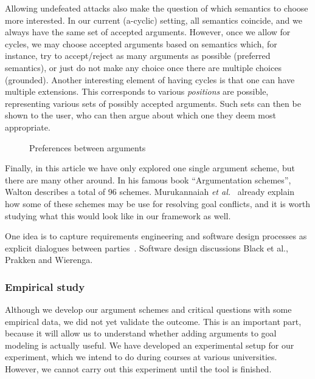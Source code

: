 Allowing undefeated attacks also make the question of which semantics to choose more interested. In our current (a-cyclic) setting, all semantics coincide, and we always have the same set of accepted arguments. However, once we allow for cycles, we may choose accepted arguments based on semantics which, for instance, try to accept/reject as many arguments as possible (preferred semantics), or just do not make any choice once there are multiple choices (grounded). Another interesting element of having cycles is that one can have multiple extensions. This corresponds to various \emph{positions} are possible, representing various sets of possibly accepted arguments. Such sets can then be shown to the user, who can then argue about which one they deem most appropriate.


\begin{figure}[ht]
\centering
{}
\caption{Preferences between arguments}
\label{fig:goalmodeling:futureargs}
\end{figure}  

Finally, in this article we have only explored one single argument scheme, but there are many other around. In his famous book ``Argumentation schemes'', Walton describes a total of 96 schemes. Murukannaiah \emph{et al.}~\cite{murukannaiah2015} already explain how some of these schemes may be use for resolving goal conflicts, and it is worth studying what this would look like in our framework as well.

One idea is to capture requirements engineering and software design processes as explicit dialogues between parties~\cite{finkelstein1989multiparty}. Software design discussions Black et al., Prakken and Wierenga.

\subsubsection*{Empirical study}

Although we develop our argument schemes and critical questions with some empirical data, we did not yet validate the outcome. This is an important part, because it will allow us to understand whether adding arguments to goal modeling is actually useful. We have developed an experimental setup for our experiment, which we intend to do during courses at various universities. However, we cannot carry out this experiment until the tool is finished.

